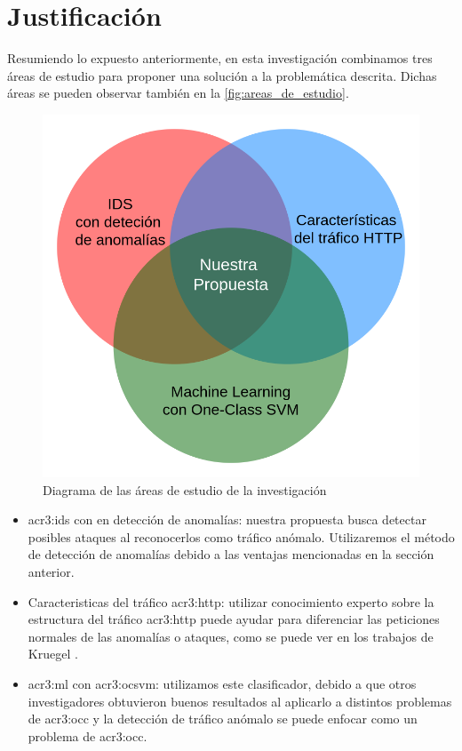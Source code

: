 \section{Justificación}

Resumiendo lo expuesto anteriormente, en esta investigación combinamos
tres áreas de estudio para proponer una solución a la problemática
descrita. Dichas áreas se pueden observar también en la
\autoref{fig:areas_de_estudio}.

\begin{figure}[ht]
    \centering
    \includegraphics[width=0.6\linewidth]{images/venn-AreasDeEstudio.png}

    \caption{Diagrama de las áreas de estudio de la investigación}
    \label{fig:areas_de_estudio}
\end{figure}

\begin{itemize}
    \item
    \gls{acr3:ids} con en detección de anomalías:
    nuestra propuesta busca detectar posibles ataques al reconocerlos como
    tráfico anómalo.
    Utilizaremos el método de detección de anomalías debido a las ventajas
    mencionadas en la sección anterior.

    \item
    Caracteristicas del tráfico \gls{acr3:http}:
    utilizar conocimiento experto sobre la estructura del tráfico
    \gls{acr3:http} puede ayudar para diferenciar las peticiones normales
    de las anomalías o ataques, como se puede ver en los trabajos de Kruegel
    \cite{kruegel2003anomaly} \cite{kruegel2005multi}.

    \item
    \gls{acr3:ml} con \gls{acr3:ocsvm}:
    utilizamos este clasificador, debido a que otros investigadores obtuvieron
    buenos resultados al aplicarlo a distintos problemas de \gls{acr3:occ}
    \cite{khan2009survey} y la detección de tráfico anómalo se puede enfocar
    como un problema de \gls{acr3:occ}.
\end{itemize}

